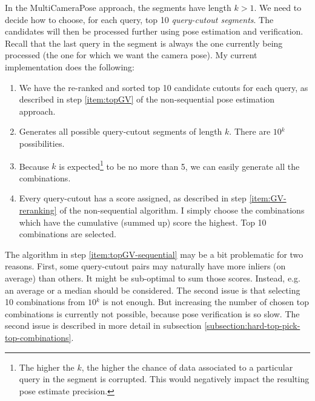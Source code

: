 \documentclass[twoside]{ctuthesis}
\theoremstyle{plain}
\theoremstyle{definition}
\theoremstyle{note}
\newcommand{\topGV}{10} %
\newcommand{\topPE}{10} %
\begin{document}
In the MultiCameraPose approach, the segments have length $k>1$. We need to decide how to choose, for each query, top \topPE{} \emph{query-cutout segments}. The candidates will then be processed further using pose estimation and verification. Recall that the last query in the segment is always the one currently being processed (the one for which we want the camera pose). My current implementation does the following:

\begin{enumerate}
	\item We have the re-ranked and sorted top \topGV{} candidate cutouts for each query, as described in step \ref{item:topGV} of the non-sequential pose estimation approach.
	\item Generates all possible query-cutout segments of length $k$. There are $\topGV{}^{k}$ possibilities.
	\item Because $k$ is expected\footnote{The higher the $k$, the higher the chance of data associated to a particular query in the segment is corrupted. This would negatively impact the resulting pose estimate precision.} to be no more than 5, we can easily generate all the combinations.
	\item \label{item:topGV-sequential} Every query-cutout has a score assigned, as described in step \ref{item:GV-reranking} of the non-sequential algorithm. I simply choose the combinations which have the cumulative (summed up) score the highest. Top \topPE{} combinations are selected.
\end{enumerate}

The algorithm in step \ref{item:topGV-sequential} may be a bit problematic for two reasons. First, some query-cutout pairs may naturally have more inliers (on average) than others. It might be sub-optimal to sum those scores. Instead, e.g. an average or a median should be considered. The second issue is that selecting \topPE{} combinations from $\topGV{}^{k}$ is not enough. But increasing the number of chosen top combinations is currently not possible, because pose verification is so slow. The second issue is described in more detail in subsection \ref{subsection:hard-top-pick-top-combinations}.
\end{document}
